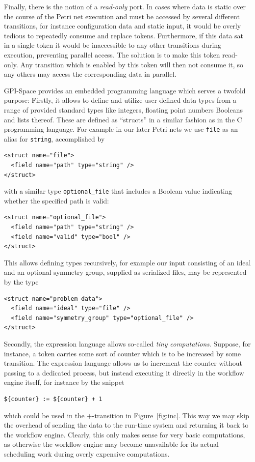 \documentclass[
  paper=a4,
  titlepage,
  bibliography=totoc,
  pagesize=pdftex
]{scrartcl}
\numberwithin{figure}{section}
\numberwithin{equation}{section}
\numberwithin{table}{section}
\theoremstyle{definition}
\numberwithin{definition}{section}
\begin{document}
Finally, there is the notion of a \emph{read-only} port. In cases where data is static
over the course of the Petri net execution and must be accessed by several different
transitions, for instance configuration data and static input, it would be overly tedious
to repeatedly consume and replace tokens. Furthermore, if this data sat in a single token
it would be inaccessible to any other transitions during execution, preventing parallel
access. The solution is to make this token read-only. Any transition which is enabled by
this token will then not consume it, so any others may access the corresponding data in
parallel.

GPI-Space provides an embedded programming language which serves a twofold purpose:
Firstly, it allows to define and utilize user-defined data types from a range of provided
standard types like integers, floating point numbers Booleans and lists thereof. These are
defined as \enquote{structs} in a similar fashion as in the C programming language. For
example in our later Petri nets we use \texttt{file} as an alias for \texttt{string},
accomplished by
\begin{verbatim}
<struct name="file">
  <field name="path" type="string" />
</struct>\end{verbatim}%
with a similar type \texttt{optional\_file} that includes a Boolean value indicating
whether the specified path is valid:
\begin{verbatim}
<struct name="optional_file">
  <field name="path" type="string" />
  <field name="valid" type="bool" />
</struct>\end{verbatim}%
This allows defining types recursively, for example our input consisting of an ideal and
an optional symmetry group, supplied as serialized files, may be represented by the type
\begin{verbatim}
<struct name="problem_data">
  <field name="ideal" type="file" />
  <field name="symmetry_group" type="optional_file" />
</struct>\end{verbatim}%

Secondly, the expression language allows so-called \emph{tiny computations}. Suppose, for
instance, a token carries some sort of counter which is to be increased by some
transition. The expression language allows us to increment the counter without passing to
a dedicated process, but instead executing it directly in the workflow engine itself, for
instance by the snippet
\begin{verbatim}${counter} := ${counter} + 1\end{verbatim}
which could be used in the $+$-transition in Figure~\ref{fig:inc}. This way we may skip
the overhead of sending the data to the run-time system and returning it back to the
workflow engine. Clearly, this only makes sense for very basic computations, as otherwise
the workflow engine may become unavailable for its actual scheduling work during overly
expensive computations.
\end{document}
